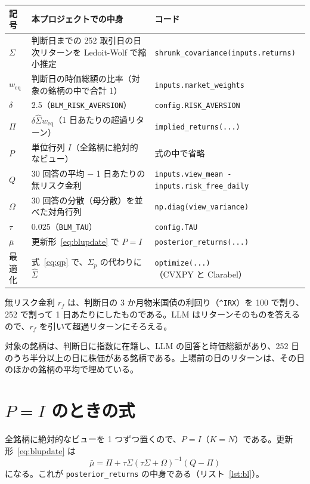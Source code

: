 \documentclass[xelatex,ja=standard,jafont=hiragino-pron,a4paper,11pt,openany]{bxjsreport}
\newcommand{\code}[1]{\texttt{#1}}
\newcommand{\weq}{w_{\mathrm{eq}}}
\newcommand{\mub}{\bar{\mu}}
\newcommand{\Sp}{\Sigma_{p}}
\begin{document}
\begin{center}
\small
\begin{tabular}{p{1.4cm}p{5.8cm}p{5.6cm}}
\toprule
記号 & 本プロジェクトでの中身 & コード \\
\midrule
$\Sigma$ & 判断日までの 252 取引日の日次リターンを Ledoit-Wolf で縮小推定 & \code{shrunk\_covariance(inputs.returns)} \\
$\weq$ & 判断日の時価総額の比率（対象の銘柄の中で合計 1） & \code{inputs.market\_weights} \\
$\delta$ & 2.5（\code{BLM\_RISK\_AVERSION}） & \code{config.RISK\_AVERSION} \\
$\Pi$ & $\delta\hat\Sigma\weq$（1 日あたりの超過リターン） & \code{implied\_returns(...)} \\
$P$ & 単位行列 $I$（全銘柄に絶対的なビュー） & 式の中で省略 \\
$Q$ & 30 回答の平均 $-$ 1 日あたりの無リスク金利 & \code{inputs.view\_mean - inputs.risk\_free\_daily} \\
$\Omega$ & 30 回答の分散（母分散）を並べた対角行列 & \code{np.diag(view\_variance)} \\
$\tau$ & 0.025（\code{BLM\_TAU}） & \code{config.TAU} \\
$\mub$ & 更新形~\eqref{eq:blupdate} で $P = I$ & \code{posterior\_returns(...)} \\
最適化 & 式~\eqref{eq:qp} で、$\Sp$ の代わりに $\hat\Sigma$ & \code{optimize(...)}（CVXPY と Clarabel） \\
\bottomrule
\end{tabular}
\end{center}

無リスク金利 $r_f$ は、判断日の 3 か月物米国債の利回り（\code{\^{}IRX}）を 100 で割り、252 で割って 1 日あたりにしたものである。LLM はリターンそのものを答えるので、$r_f$ を引いて超過リターンにそろえる。

対象の銘柄は、判断日に指数に在籍し、LLM の回答と時価総額があり、252 日のうち半分以上の日に株価がある銘柄である。上場前の日のリターンは、その日のほかの銘柄の平均で埋めている。

\section{$P = I$ のときの式}

全銘柄に絶対的なビューを 1 つずつ置くので、$P = I$（$K = N$）である。更新形~\eqref{eq:blupdate} は
\begin{equation}
\mub = \Pi + \tau\Sigma\left(\tau\Sigma + \Omega\right)^{-1}\left(Q - \Pi\right)
\label{eq:blI}
\end{equation}
になる。これが \code{posterior\_returns} の中身である（リスト~\ref{lst:bl}）。
\end{document}
